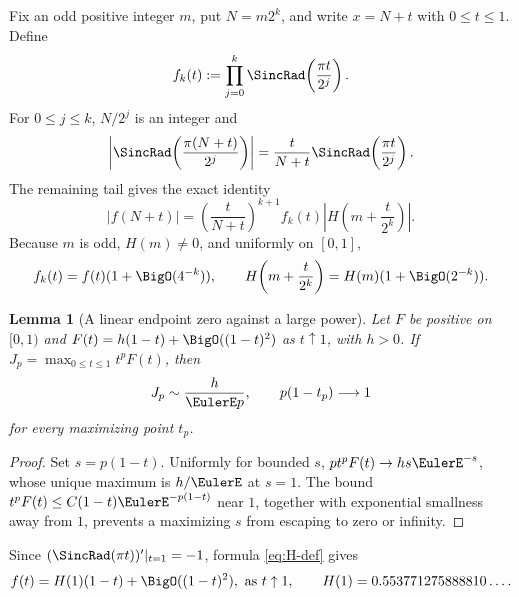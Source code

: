 \documentclass[11pt,oneside]{article}
\newtheorem{lemma}[theorem]{Lemma}
\theoremstyle{definition}
\theoremstyle{remark}
\begin{document}
Fix an odd positive integer $m$, put $N=m2^k$, and write $x=N+t$ with
$0\le t\le1$.  Define
\begin{equation}
 f_k(t):=\prod_{j=0}^{k}\SincRad\!\left(\frac{\pi t}{2^j}\right).
 \label{eq:fk}
\end{equation}
For $0\le j\le k$, $N/2^j$ is an integer and
\begin{equation}
 \left|\SincRad\!\left(\frac{\pi(N+t)}{2^j}\right)\right|
 =\frac{t}{N+t}\SincRad\!\left(\frac{\pi t}{2^j}\right).
\end{equation}
The remaining tail gives the exact identity
\begin{equation}
 |f(N+t)|
 =\left(\frac{t}{N+t}\right)^{k+1}
 f_k(t)\left|H\!\left(m+\frac{t}{2^k}\right)\right|.
 \label{eq:near-m2k}
\end{equation}
Because $m$ is odd, $H(m)\ne0$, and uniformly on $[0,1]$,
\begin{equation}
 f_k(t)=f(t)(1+\BigO(4^{-k})),
 \qquad
 H\!\left(m+\frac{t}{2^k}\right)=H(m)(1+\BigO(2^{-k})).
 \label{eq:tail-uniform}
\end{equation}

\begin{lemma}[A linear endpoint zero against a large power]
\label{lem:boundary-max}
Let $F$ be positive on $[0,1)$ and
$F(t)=h(1-t)+\BigO((1-t)^2)$ as $t\uparrow1$, with $h>0$.  If
$J_p=\max_{0\le t\le1}t^pF(t)$, then
\begin{equation}
 J_p\sim\frac{h}{\EulerE p},
 \qquad
 p(1-t_p)\longrightarrow1
 \label{eq:boundary-max}
\end{equation}
for every maximizing point $t_p$.
\end{lemma}

\begin{proof}
Set $s=p(1-t)$.  Uniformly for bounded $s$,
$p t^pF(t)\to hs\EulerE^{-s}$, whose unique maximum is $h/\EulerE$ at $s=1$.
The bound $t^pF(t)\le C(1-t)\EulerE^{-p(1-t)}$ near $1$, together with exponential
smallness away from $1$, prevents a maximizing $s$ from escaping to zero or
infinity.
\end{proof}

Since $(\SincRad(\pi t))'|_{t=1}=-1$, formula \eqref{eq:H-def} gives
\begin{equation}
 f(t)=H(1)(1-t)+\BigO((1-t)^2),
 \text{ as }t\uparrow1,
 \qquad
 H(1)=0.553771275888810\ldots .
 \label{eq:f-near-one}
\end{equation}
\end{document}
